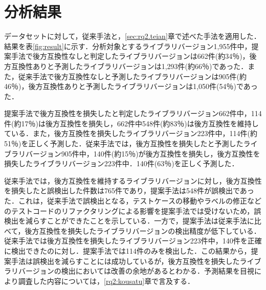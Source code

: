 \documentclass[11pt,dvipdfmx]{jreport}
\begin{document}
\section{分析結果}

データセットに対して，従来手法と，\ref{sec:rq2.teian}章で述べた手法を適用した．結果を表\ref{fig:result}に示す．分析対象とするライブラリバージョン1,955件中，提案手法で後方互換性なしと判定したライブラリバージョンは662件(約34％)，後方互換性ありと予測したライブラリバージョンは1,293件(約66％)であった．また，従来手法で後方互換性なしと予測したライブラリバージョンは905件(約46％)，後方互換性ありと予測したライブラリバージョンは1,050件(54％)であった．

提案手法で後方互換性を損失したと判定したライブラリバージョン662件中，114件(約17％)は後方互換性を損失し，662件中548件(約83％)は後方互換性を維持している．また，後方互換性を損失したライブラリバージョン223件中，114件(約51％)を正しく予測した．従来手法では，後方互換性を損失したと予測したライブラリバージョン905件中，140件(約15％)が後方互換性を損失し，後方互換性を損失したライブラリバージョン223件中．140件(63％)を正しく予測した．

従来手法では，後方互換性を維持するライブラリバージョンに対し，後方互換性を損失したと誤検出した件数は765件であり，提案手法は548件が誤検出であった．これは，従来手法で誤検出となる，テストケースの移動やラベルの修正などのテストコードのリファクタリングによる影響を提案手法では受けないため，誤検出を減らすことができたことを示している．一方で，提案手法は従来手法に比べて，後方互換性を損失したライブラリバージョンの検出精度が低下している．従来手法では後方互換性を損失したライブラリバージョン223件中，140件を正確に検出できたのに対し．提案手法では114件のみを検出した．この結果から，提案手法は誤検出を減らすことには成功しているが，後方互換性を損失したライブラリバージョンの検出においては改善の余地があるとわかる．予測結果を目視により調査した内容については，\ref{rq2:kousatu}章で言及する．
\end{document}

